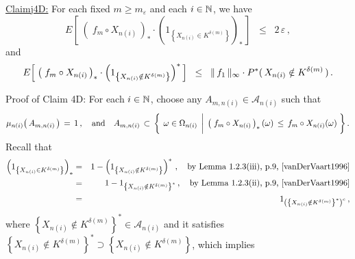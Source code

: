 \vskip 0.8cm
\begin{center}\begin{minipage}{6.5in}
\underline{Claim{{\color{white}j}}4D:}\;\;
For each fixed $m \geq m_{\varepsilon}$ and each $i \in \mathbb{N}$, we have
\begin{equation*}
E\!\left[\;
	\left(\;f_{m} \circ X_{n(i)}\,\right)_{*}
	\cdot
	\left(1_{\left\{X_{n(i)} \in K^{\delta(m)}\right\}}\right)_{*}
\,\right]
\;\;\leq\;\; 2\,\varepsilon\,,
\end{equation*}
and
\begin{equation*}
E\!\left[\;
	\left(\;f_{m} \circ X_{n(i)}\,\right)_{*}
	\cdot
	\left(1_{\left\{X_{n(i)} \notin K^{\delta(m)}\right\}}\right)^{*}
\,\right]
\;\;\leq\;\; \Vert\,f_{1}\,\Vert_{\infty} \cdot P^{*}(\,X_{n(i)} \overset{{\color{white}.}}{\notin} K^{\delta(m)}\,)\,.
\end{equation*}
\end{minipage}\end{center}
Proof of Claim 4D:\;\;
For each $i \in \mathbb{N}$, choose any $A_{m,n(i)} \in \mathcal{A}_{n(i)}$ such that
\begin{equation*}
\mu_{n(i)}\!\left(\,A_{m,n(i)}\,\right) \,=\, 1\,,
\quad\textnormal{and}\quad
A_{m,n(i)} \,\subset\,
\left\{\;
	\left.
	\omega \overset{{\color{white}-}}{\in} \Omega_{n(i)}
	\;\,\right\vert\;
	\left(\;f_{m} \circ X_{n(i)}\,\right)_{*}(\omega) \,\leq\, f_{m} \circ X_{n(i)}(\omega)
\;\right\}.
\end{equation*}
Recall that
\begin{eqnarray*}
\left(1_{\left\{X_{n(i)} \in K^{\delta(m)}\right\}}\right)_{*}
& = &
	1 - \left(1_{\left\{X_{n(i)} \notin K^{\delta(m)}\right\}}\right)^{*}\,,
	\quad
	\textnormal{by Lemma 1.2.3(iii), p.9, \cite{vanDerVaart1996}}
\\
& = &
	1 - 1_{\left\{X_{n(i)} \notin K^{\delta(m)}\right\}^{*}}\,,
	\quad
	\textnormal{by Lemma 1.2.3(ii), p.9, \cite{vanDerVaart1996}}
\\
& = &
	1_{\left(\left\{X_{n(i)} \notin K^{\delta(m)}\right\}^{*}\right)^{c}}\,,
\end{eqnarray*}
where $\left\{X_{n(i)} \notin K^{\delta(m)}\right\}^{*} \in \mathcal{A}_{n(i)}$
and it satisfies 
$\left\{X_{n(i)} \notin K^{\delta(m)}\right\}^{*} \supset \left\{X_{n(i)} \notin K^{\delta(m)}\right\}$,
which implies
